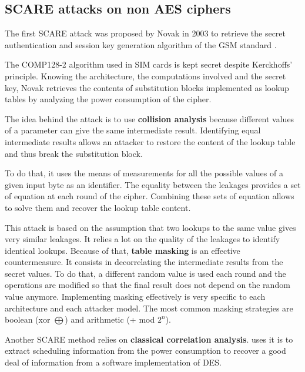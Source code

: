 \documentclass[11pt]{sdm}
\begin{document}
\subsection{SCARE attacks on non AES ciphers}

The first SCARE attack was proposed by Novak in 2003 to retrieve the secret authentication and session key generation algorithm of the GSM standard \parencite{Novak_2003}.

The COMP128-2 algorithm used in SIM cards is kept secret despite Kerckhoffs' principle.
Knowing the architecture, the computations involved and the secret key, Novak retrieves the contents of substitution blocks implemented as lookup tables by analyzing the power consumption of the cipher.

The idea behind the attack is to use \textbf{collision analysis} because different values of a parameter can give the same intermediate result.
Identifying equal intermediate results allows an attacker to restore the content of the lookup table and thus break the substitution block.

To do that, it uses the means of measurements for all the possible values of a given input byte as an identifier.
The equality between the leakages provides a set of equation at each round of the cipher.
Combining these sets of equation allows to solve them and recover the lookup table content.

This attack is based on the assumption that two lookups to the same value gives very similar leakages.
It relies a lot on the quality of the leakages to identify identical lookups.
Because of that, \textbf{table masking} is an effective countermeasure.
It consists in decorrelating the intermediate results from the secret values.
To do that, a different random value is used each round and the operations are modified so that the final result does not depend on the random value anymore.
Implementing masking effectively is very specific to each architecture and each attacker model.
The most common masking strategies are boolean (xor $\bigoplus$) and arithmetic (+ mod $2^n$). %

\smallbreak
Another SCARE method relies on \textbf{classical correlation analysis}.
\parencite{Daudigny_Ledig_Muller_Valette_2005} uses it is to extract scheduling information from the power consumption to recover a good deal of information from a software implementation of DES.
\end{document}
